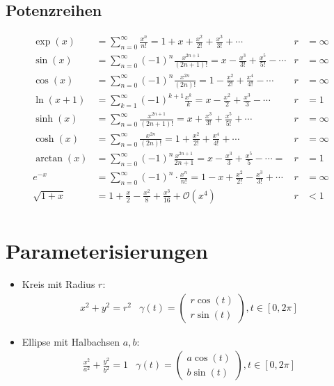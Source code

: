 \documentclass[a4paper,10pt]{article}
\def\sumk{\sum_{k=1}^\infty}
\def\sumn{\sum_{n=0}^\infty}
\begin{document}
\subsection{Potenzreihen}
\begin{align*}
\exp(x) &= \sumn \frac{x^n}{n!} = 1 + x + \frac{x^2}{2!} + \frac{x^3}{3!} + \cdots & r &= \infty \\
\sin(x) &= \sumn (-1)^n \frac{x^{2n + 1}}{(2n + 1)!} = x - \frac{x^3}{3!} + \frac{x^5}{5!} - \cdots & r &= \infty \\
\cos(x) &= \sumn (-1)^n \frac{x^{2n}}{(2n)!} = 1 - \frac{x^2}{2!} + \frac{x^4}{4!} - \cdots & r &= \infty \\
\ln(x + 1) &= \sumk (-1)^{k+1} \frac{x^k}{k} = x - \frac{x^2}{2} + \frac{x^3}{3} - \cdots & r &= 1 \\
\sinh(x) &= \sumn \frac{x^{2n+1}}{(2n+1)!} = x + \frac{x^3}{3!} + \frac{x^5}{5!} + \cdots & r &= \infty \\
\cosh(x) &= \sumn \frac{x^{2n}}{(2n)!} = 1 + \frac{x^2}{2!} + \frac{x^4}{4!} + \cdots & r &= \infty \\
\arctan(x) &= \sumn (-1)^n \frac{x^{2n+1}}{2n+1} = x - \frac{x^3}{3} + \frac{x^5}{5} - \cdots =  & r &= 1 \\
e^{-x} &= \sumn (-1)^n \cdot \frac{x^n}{n!} = 1 - x + \frac{x^2}{2!} - \frac{x^3}{3!} + \cdots & r &= \infty \\
\sqrt{1+x} &= 1 + \frac{x}{2} - \frac{x^2}{8} + \frac{x^3}{16} + \mathcal{O}(x^4) & r &< 1 \\
\end{align*}

\section{Parameterisierungen}

\begin{itemize}
  \item Kreis mit Radius $r$:{
    \begin{align*} 
      & x^2 + y^2 = r^2 & \gamma(t) = \begin{pmatrix} r \cos(t) \\ r \sin(t) \end{pmatrix}, t \in [0, 2\pi] &
    \end{align*}
  }
  \item Ellipse mit Halbachsen $a, b$:{
    \begin{align*} 
      & \frac{x^2}{a^2} + \frac{y^2}{b^2} = 1 & \gamma(t) = \begin{pmatrix} a \cos(t) \\ b \sin(t) \end{pmatrix}, t \in [0, 2\pi] &
    \end{align*}
  }
\end{itemize}
\end{document}
